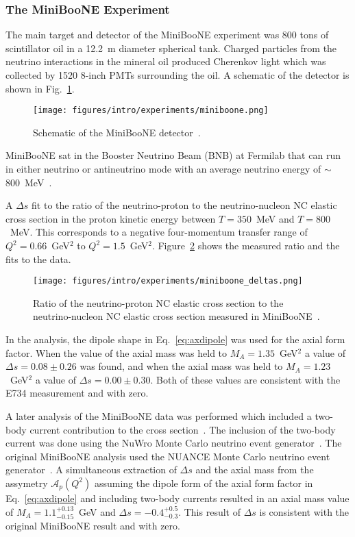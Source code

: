   \subsubsection{The MiniBooNE Experiment}\label{sec:miniboonence}
  The main target and detector of the MiniBooNE experiment was 800 tons of
  scintillator oil in a 12.2~m diameter spherical tank. Charged particles
  from the neutrino interactions in the mineral oil produced Cherenkov light
  which was collected by 1520 8-inch PMTs surrounding the oil. A schematic of
  the detector is shown in Fig.~\ref{fig:miniboonedetector}.
  \begin{figure}[h]
    \centering
    \texttt{[image: figures/intro/experiments/miniboone.png]}
    \caption{Schematic of the MiniBooNE detector~\cite{Cheng:2012yy}.}
    \label{fig:miniboonedetector}
  \end{figure}
  MiniBooNE sat in the Booster Neutrino Beam (BNB) at Fermilab that can run
  in either neutrino or antineutrino mode with an average neutrino energy of
  $\sim$800~MeV~\cite{Aguilar-Arevalo:2008yp}.

  A $\Delta s$ fit to the ratio of the neutrino-proton to the
  neutrino-nucleon NC elastic cross section in the proton kinetic energy
  between $T = 350$~MeV and $T = 800$~MeV. This corresponds to a negative
  four-momentum transfer range of $Q^2 = 0.66$~GeV$^2$ to $Q^2 =
  1.5$~GeV$^2$. Figure~\ref{fig:miniboonedeltas} shows the measured ratio and
  the fits to the data.
  \begin{figure}[h]
    \centering
    \texttt{[image: figures/intro/experiments/miniboone\_deltas.png]}
    \caption{Ratio of the neutrino-proton NC elastic cross section to the
    neutrino-nucleon NC elastic cross section measured in
    MiniBooNE~\cite{Aguilar-Arevalo:2010cx}.}
    \label{fig:miniboonedeltas}
  \end{figure}
  In the analysis, the dipole shape in Eq.~\ref{eq:axdipole} was used for the
  axial form factor. When the value of the axial mass was held to $M_A =
  1.35$~GeV$^2$ a value of $\Delta s = 0.08 \pm 0.26$ was found, and when the
  axial mass was held to $M_A = 1.23$~GeV$^2$ a value of $\Delta s = 0.00 \pm
  0.30$. Both of these values are consistent with the E734 measurement and
  with zero.

  A later analysis of the MiniBooNE data was performed which included a
  two-body current contribution to the cross section~\cite{Golan:2013jtj}.
  The inclusion of the two-body current was done using the NuWro Monte Carlo
  neutrino event generator~\cite{Golan:2012wx}. The original MiniBooNE
  analysis used the NUANCE Monte Carlo neutrino event
  generator~\cite{Casper:2002sd}. A simultaneous extraction of $\Delta s$ and
  the axial mass from the assymetry $\mathcal{A}_p(Q^2)$ assuming the dipole
  form of the axial form factor in Eq.~\ref{eq:axdipole} and including
  two-body currents resulted in an axial mass value of $M_A =
  1.1^{+0.13}_{-0.15}$~GeV and $\Delta s = -0.4^{+0.5}_{-0.3}$. This result
  of $\Delta s$ is consistent with the original MiniBooNE result and with
  zero.

